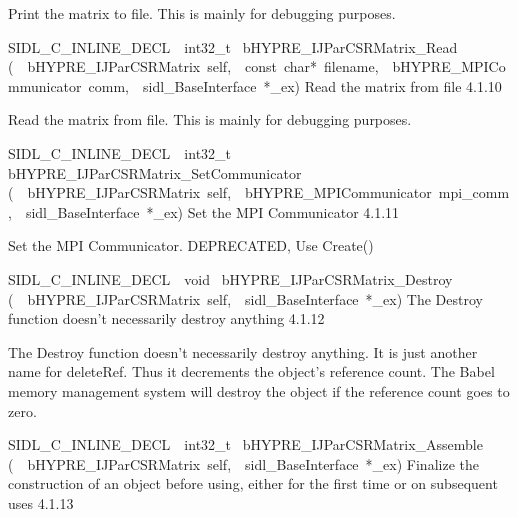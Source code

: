 \documentclass{article}
\begin{document}
\begin{cxxentry}
\begin{cxxentry}
\begin{cxxfunction}
\begin{cxxdoc}
Print the matrix to file.  This is mainly for debugging
purposes.
\end{cxxdoc}
\end{cxxfunction}
\begin{cxxfunction}
{SIDL\_C\_INLINE\_DECL\ \ int32\_t\ }
        {bHYPRE\_IJParCSRMatrix\_Read}
        {(\ \ bHYPRE\_IJParCSRMatrix\ self,\ \ const\ char*\ filename,\ \ bHYPRE\_MPICommunicator\ comm,\ \ sidl\_BaseInterface\ *\_ex)}
        {
Read the matrix from file}
        {4.1.10}
\begin{cxxdoc}

Read the matrix from file.  This is mainly for debugging
purposes.
\end{cxxdoc}
\end{cxxfunction}
\begin{cxxfunction}
{SIDL\_C\_INLINE\_DECL\ \ int32\_t\ }
        {bHYPRE\_IJParCSRMatrix\_SetCommunicator}
        {(\ \ bHYPRE\_IJParCSRMatrix\ self,\ \ bHYPRE\_MPICommunicator\ mpi\_comm,\ \ sidl\_BaseInterface\ *\_ex)}
        {
Set the MPI Communicator}
        {4.1.11}
\begin{cxxdoc}

Set the MPI Communicator.  DEPRECATED, Use Create()
\end{cxxdoc}
\end{cxxfunction}
\begin{cxxfunction}
{SIDL\_C\_INLINE\_DECL\ \ void\ }
        {bHYPRE\_IJParCSRMatrix\_Destroy}
        {(\ \ bHYPRE\_IJParCSRMatrix\ self,\ \ sidl\_BaseInterface\ *\_ex)}
        {
The Destroy function doesn't necessarily destroy anything}
        {4.1.12}
\begin{cxxdoc}

The Destroy function doesn't necessarily destroy anything.
It is just another name for deleteRef.  Thus it decrements the
object's reference count.  The Babel memory management system will
destroy the object if the reference count goes to zero.
\end{cxxdoc}
\end{cxxfunction}
\begin{cxxfunction}
{SIDL\_C\_INLINE\_DECL\ \ int32\_t\ }
        {bHYPRE\_IJParCSRMatrix\_Assemble}
        {(\ \ bHYPRE\_IJParCSRMatrix\ self,\ \ sidl\_BaseInterface\ *\_ex)}
        {
Finalize the construction of an object before using, either
for the first time or on subsequent uses}
        {4.1.13}
\begin{cxxdoc}


\end{cxxdoc}
\end{cxxfunction}
\end{cxxentry}
\end{cxxentry}
\end{document}
